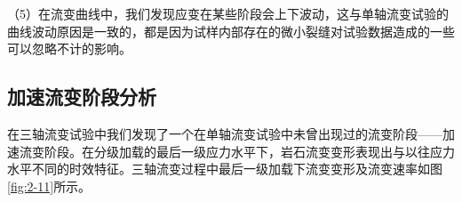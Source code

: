 （5）在流变曲线中，我们发现应变在某些阶段会上下波动，这与单轴流变试验的曲线波动原因是一致的，都是因为试样内部存在的微小裂缝对试验数据造成的一些可以忽略不计的影响。


\subsection{加速流变阶段分析}
在三轴流变试验中我们发现了一个在单轴流变试验中未曾出现过的流变阶段——加速流变阶段。在分级加载的最后一级应力水平下，岩石流变变形表现出与以往应力水平不同的时效特征。三轴流变过程中最后一级加载下流变变形及流变速率如图\ref{fig:2-11}所示。

\begin{figure}[ht!]
    \centering
	

\end{figure}
